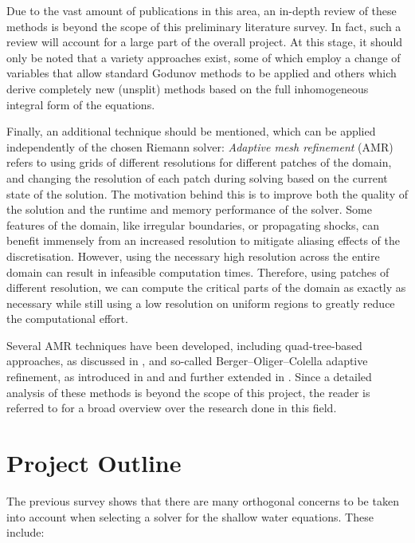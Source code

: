 \documentclass[a4paper,onecolumn,11pt]{article}
\begin{document}
Due to the vast amount of publications in this area, an in-depth review of these methods is beyond the scope of this preliminary literature survey. In fact, such a review will account for a large part of the overall project. At this stage, it should only be noted that a variety approaches exist, some of which employ a change of variables that allow standard Godunov methods to be applied and others which derive completely new (unsplit) methods based on the full inhomogeneous integral form of the equations.

Finally, an additional technique should be mentioned, which can be applied independently of the chosen Riemann solver: \emph{Adaptive mesh refinement} (AMR) refers to using grids of different resolutions for different patches of the domain, and changing the resolution of each patch during solving based on the current state of the solution. The motivation behind this is to improve both the quality of the solution and the runtime and memory performance of the solver. Some features of the domain, like irregular boundaries, or propagating shocks, can benefit immensely from an increased resolution to mitigate aliasing effects of the discretisation. However, using the necessary high resolution across the entire domain can result in infeasible computation times. Therefore, using patches of different resolution, we can compute the critical parts of the domain as exactly as necessary while still using a low resolution on uniform regions to greatly reduce the computational effort.

Several AMR techniques have been developed, including quad-tree-based approaches, as discussed in \citet{rogers2001adaptive}, and so-called Berger--Oliger--Colella adaptive refinement, as introduced in \citet{berger1984adaptive} and \citet{berger1989local} and further extended in \citet{BergerLeVeque98}. Since a detailed analysis of these methods is beyond the scope of this project, the reader is referred to \citet{plewa2005adaptive} for a broad overview over the research done in this field.




\section*{Project Outline}

The previous survey shows that there are many orthogonal concerns to be taken into account when selecting a solver for the shallow water equations. These include:
\end{document}
